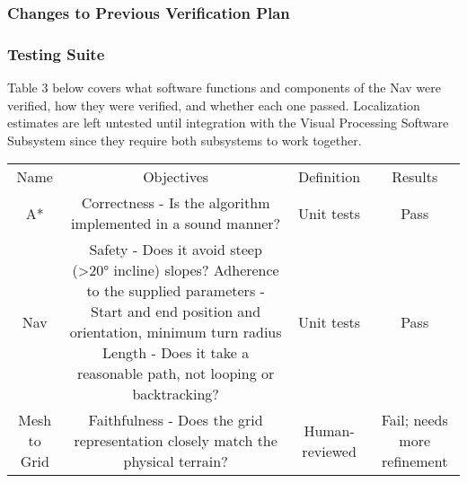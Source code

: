 \subsubsection{Changes to Previous Verification Plan}\label{subsubsec:changes-to-plan}
\subsubsection{Testing Suite}\label{subsubsec:testing-suite}
Table 3 below covers what software functions and components of the Nav were verified, how they were verified, and
whether each one passed.
Localization estimates are left untested until integration with the Visual Processing Software Subsystem since they
require both subsystems to work together.
\begin{center}
    \begin{tabular}{ |c|c|c|c| }
        \hline
        Name & Objectives & Definition & Results \\
        A* & Correctness - Is the algorithm implemented in a sound manner? & Unit tests & Pass \\
        Nav & Safety - Does it avoid steep (>20° incline) slopes? Adherence to the supplied parameters - Start and end position and orientation, minimum turn radius Length - Does it take a reasonable path, not looping or backtracking? & Unit tests & Pass \\
        Mesh to Grid & Faithfulness - Does the grid representation closely match the physical terrain? & Human-reviewed & Fail; needs more refinement
        \hline
    \end{tabular}
\end{center}